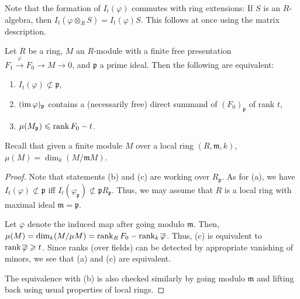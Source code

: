 \documentclass[12pt]{article}
\begin{document}
\begin{rem}
	Note that the formation of $I_{t}(\varphi)$ commutes with ring extensions: If $S$ is an $R$-algebra, then $I_{t}(\varphi \otimes_{R} S) = I_{t}(\varphi) S$. This follows at once using the matrix description.
\end{rem}

\begin{lem} 
	Let $R$ be a ring, $M$ an $R$-module with a finite free presentation $F_{1} \xrightarrow{\varphi} F_{0} \to M \to 0$, and $\mathfrak{p}$ a prime ideal. Then the following are equivalent:
	\begin{enumerate}[label=(\alph*)]
		\item $I_{t}(\varphi) \not\subset \mathfrak{p}$,
		\item $(\operatorname{im} \varphi)_{\mathfrak{p}}$ contains a (necessarily free) direct summand of $(F_{0})_{\mathfrak{p}}$ of rank $t$,
		\item $\mu(M_{\mathfrak{p}}) \leqslant \operatorname{rank} F_{0} - t$.
	\end{enumerate}
\end{lem}
Recall that given a finite module $M$ over a local ring $(R, \mathfrak{m}, k)$, $\mu(M) = \dim_{k}(M/\mathfrak{m} M)$.

\begin{proof} 
	Note that statements (b) and (c) are working over $R_{\mathfrak{p}}$. As for (a), we have $I_{t}(\varphi) \not\subset \mathfrak{p}$ iff $I_{t}(\varphi_{\mathfrak{p}}) \not\subset \mathfrak{p} R_{\mathfrak{p}}$. Thus, we may assume that $R$ is a local ring with maximal ideal $\mathfrak{m} = \mathfrak{p}$.

	Let $\overline{\varphi}$ denote the induced map after going modulo $\mathfrak{m}$. Then, $\mu(M) = \dim_{k}(M/\mu M) = \operatorname{rank}_{R} F_{0} - \operatorname{rank}_{k} \overline{\varphi}$. Thus, (c) is equivalent to $\operatorname{rank} \overline{\varphi} \geqslant t$. Since ranks (over fields) can be detected by appropriate vanishing of minors, we see that (a) and (c) are equivalent.

	The equivalence with (b) is also checked similarly by going modulo $\mathfrak{m}$ and lifting back using usual properties of local rings.
\end{proof}
\end{document}
